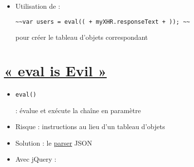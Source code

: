 \begin{itemize}
\tightlist
\item
  Utilisation de :
  \begin{otherlanguage}{english}\texttt{\textasciitilde{}\textasciitilde{}var\ users\ =\ eval(\textquotesingle{}(\textquotesingle{}\ +\ myXHR.responseText\ +\ \textquotesingle{})\textquotesingle{});\ \textasciitilde{}\textasciitilde{}}\end{otherlanguage}
  pour créer le tableau d'objets correspondant
\end{itemize}

\hypertarget{eval-is-evil-22}{%
\section{\texorpdfstring{\href{https://javascriptweblog.wordpress.com/2010/04/19/how-evil-is-eval/}{«
eval is Evil »}}{« eval is Evil »}}\label{eval-is-evil-22}}

\begin{itemize}
\tightlist
\item
  \begin{otherlanguage}{english}\texttt{eval()}\end{otherlanguage} :
  évalue et exécute la chaîne en paramètre
\item
  Risque : instructions au lieu d'un tableau d'objets
\item
  Solution : le
  \href{https://developer.mozilla.org/fr/docs/Web/JavaScript/Reference/Objets_globaux/JSON/parse}{parser}
  JSON
\end{itemize}

\begin{otherlanguage}{english}

\begin{Shaded}
\begin{Highlighting}[]
\OperatorTok{=} \NormalTok{(}\NormalTok{)}\OperatorTok{;}
\OperatorTok{=} \OperatorTok{;}
\end{Highlighting}
\end{Shaded}

\end{otherlanguage}

\begin{itemize}
\tightlist
\item
  Avec jQuery :
\end{itemize}

